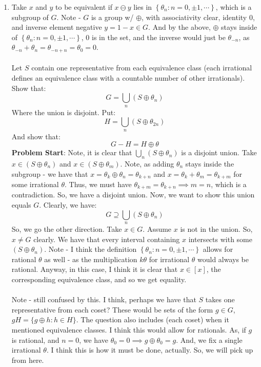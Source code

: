 \documentclass[12pt,a4paper]{article}
\newcommand{\1}[1]{\mathbbm{1}\left\{ #1 \right\}}
\begin{document}
\begin{enumerate}
	\item Take $x$ and $y$ to be equivalent if $x \ominus y$ lies in $\left\{\theta_n: n = 0, \pm 1, \cdots\right\}$, which is a subgroup of $G$. Note - $G$ is a group w/ $\oplus$, with associativity clear, identity $0$, and inverse element negative $y = 1 - x \in G$. And by the above, $\oplus$ stays inside of $\left\{\theta_n: n = 0, \pm 1, \cdots\right\}$, $0$ is in the set, and the inverse would just be $\theta_{-n}$, as $\theta_{-n} + \theta_n = \theta_{-n + n} = \theta_0 = 0$.
	\\\\
	Let $S$ contain one representative from each equivalence class (each irrational defines an equivalence class with a countable number of other irrationals). Show that:
	$$
		G = \bigcup_n (S \oplus \theta_n)
	$$
	Where the union is disjoint. Put:
	$$
		H = \bigcup_n (S \oplus \theta_{2n})
	$$
	And show that:
	$$
		G - H = H \oplus \theta
	$$
	\textbf{Problem Start}: Note, it is clear that $\bigcup_n (S \oplus \theta_n)$ is a disjoint union. Take $x \in (S \oplus \theta_n)$ and $x \in (S \oplus \theta_m)$. Note, as adding $\theta_n$ stays inside the subgroup - we have that $x = \theta_k \oplus \theta_n = \theta_{k + n}$ and $x = \theta_k + \theta_m = \theta_{k + m}$ for some irrational $\theta$. Thus, we must have $\theta_{k + m} = \theta_{k + n} \implies m = n$, which is a contradiction. So, we have a disjoint union. Now, we want to show this union equals $G$. Clearly, we have:
	$$
		G \supseteq \bigcup_n (S \oplus \theta_n)
	$$
	So, we go the other direction. Take $x \in G$. Assume $x$ is not in the union. So, $x \neq G$ clearly. We have that every interval containing $x$ intersects with some $(S \oplus \theta_n)$. Note - I think the definition $\left\{\theta_n: n = 0, \pm 1, \cdots\right\}$ allows for rational $\theta$ as well - as the multiplication $k\theta$ for irrational $\theta$ would always be rational. Anyway, in this case, I think it is clear that $x \in [x]$, the corresponding equivalence class, and so we get equality.
	\\\\
	Note - still confused by this. I think, perhaps we have that $S$ takes one representative from each coset? These would be sets of the form $g \in G$, $gH = \{g \oplus h : h \in H\}$. The question also includes (each coset) when it mentioned equivalence classes. I think this would allow for rationals. As, if $g$ is rational, and $n = 0$, we have $\theta_0 = 0 \implies g \oplus \theta_0 = g$. And, we fix a single irrational $\theta$. I think this is how it must be done, actually. So, we will pick up from here.

\end{enumerate}
\end{document}
